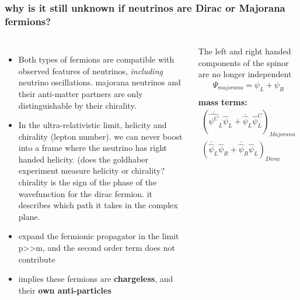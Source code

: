 \documentclass{beamer}
\begin{document}
	\begin{frame}
		\frametitle{why is it still unknown if neutrinos are Dirac or Majorana fermions?}
		\begin{columns}[c] %
			
			\begin{itemize}
			\item Both types of fermions are compatible with observed features of neutrinos, \textit{including} neutrino oscillations. majorana neutrinos and their anti-matter partners are only distinguishable by their chirality.
			\item In the ultra-relativistic limit, helicity and chirality (lepton number). we can never boost into a frame where the neutrino has right handed helicity. (does the goldhaber experiment measure helicity or chirality? chirality is the sign of the phase of the wavefunction for the dirac fermion. it describes which path it takes in the complex plane.
			\item expand the fermionic propagator in the limit p>>m, and the second order term does not contribute
			\item implies these fermions are \textbf{chargeless}, and their \textbf{own anti-particles}
			\end{itemize}
			
			{\footnotesize The left and right handed components of the spinor are no longer independent}
			\begin{eqnarray*}
			\Psi_{majorana} = \psi_L + \psi_R \\
			\end{eqnarray*}
			{\footnotesize \textbf{mass terms:}}
			\begin{eqnarray*}
			\left( \overline{\hat{\psi^C}}_L \hat{\psi}_L + \overline{\hat{\psi}}_L \hat{\psi}^C_L \right)_{Majorana} \\
			 \left(\overline{\hat{\psi}}_L \hat{\psi}_R + \overline{\hat{\psi}}_R \hat{\psi}_L\right)_{Dirac}
			\end{eqnarray*}
			
		\end{columns}
	\end{frame}		
	
\end{document}
